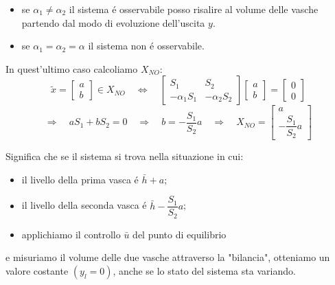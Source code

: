 \documentclass[../main.tex]{subfiles}
\begin{document}
\begin{Exercise}[title={Studiare l'osservabilit\'a di due vasche in parallelo}]
				\begin{itemize}
					\item 
						se $ \alpha_1 \neq \alpha_2 $ il sistema \'e osservabile posso risalire al volume delle vasche partendo dal modo di evoluzione dell'uscita $ y $.
					\item 
						se $ \alpha_1 = \alpha_2 = \alpha $ il sistema non \'e osservabile.
				\end{itemize}
			
				In quest'ultimo caso calcoliamo $ X_{NO} $:
				\[
					\tilde x =
					\begin{bmatrix}
						a\\
						b
					\end{bmatrix} \in X_{NO}
					\quad\Leftrightarrow\quad 
					\begin{bmatrix}
						S_1 & S_2\\
						-\alpha_1 S_1 & -\alpha_2 S_2
					\end{bmatrix}
					\begin{bmatrix}
						a\\
						b
					\end{bmatrix} =
					\begin{bmatrix}
						0\\
						0
					\end{bmatrix}
				\]
				\[
					\Rightarrow\quad aS_1 + bS_2 = 0 \quad\Rightarrow\quad b = -\dfrac{S_1}{S_2}a \quad\Rightarrow\quad X_{NO} =
					\begin{bmatrix}
						a\\
						-\dfrac{S_1}{S_2}a
					\end{bmatrix}
				\]
				
				Significa che se il sistema si trova nella situazione in cui:
				\begin{itemize}
					\item 
						il livello della prima vasca \'e $ \bar h + a $;
					\item 
						il livello della seconda vasca \'e $ \bar h - \dfrac{S_1}{S_2}a $;
					\item 
						applichiamo il controllo $ \bar u $ del punto di equilibrio
				\end{itemize}
				e misuriamo il volume delle due vasche attraverso la "bilancia", otteniamo un valore costante $ (y_l = 0) $, anche se lo stato del sistema sta variando.
				

\end{Exercise}
\end{document}

